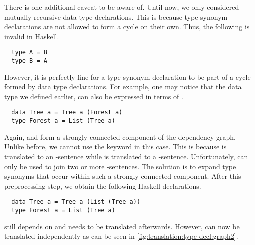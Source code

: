 There is one additional caveat to be aware of.
Until now, we only considered mutually recursive data type declarations.
This is because type synonym declarations are not allowed to form a cycle on their own.
Thus, the following is invalid in Haskell.
\begin{verbatim}
  type A = B
  type B = A
\end{verbatim}
However, it is perfectly fine for a type synonym declaration to be part of a cycle formed by data type declarations.
For example, one may notice that the  data type we defined earlier, can also be expressed in terms of .
\begin{verbatim}
  data Tree a = Tree a (Forest a)
  type Forest a = List (Tree a)
\end{verbatim}
Again,  and  form a strongly connected component of the dependency graph.
Unlike before, we cannot use the  keyword in this case.
This is because  is translated to an -sentence while  is translated to a -sentence.
Unfortunately,  can only be used to join two or more -sentences.
The solution is to expand type synonyms that occur within such a strongly connected component.
After this preprocessing step, we obtain the following Haskell declarations.
\begin{verbatim}
  data Tree a = Tree a (List (Tree a))
  type Forest a = List (Tree a)
\end{verbatim}
 still depends on  and needs to be translated afterwards.
However,  can now be translated independently as can be seen in \autoref{fig:translation:type-decl:graph2}.

